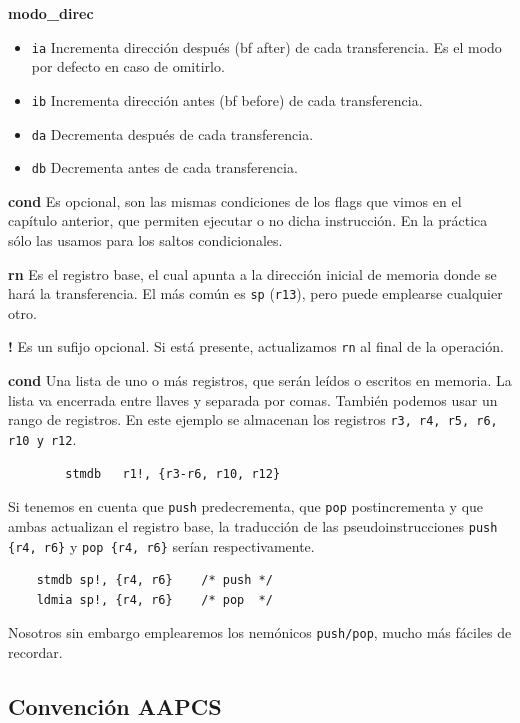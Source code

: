 {\bf modo\_direc}
\begin{itemize}
  \item{\tt ia} Incrementa dirección después ({bf a}fter) de cada transferencia. Es el modo por defecto
                en caso de omitirlo.
  \item{\tt ib} Incrementa dirección antes ({bf b}efore) de cada transferencia.
  \item{\tt da} Decrementa después de cada transferencia.
  \item{\tt db} Decrementa antes de cada transferencia.
\end{itemize}

{\bf cond} Es opcional, son las mismas condiciones de los flags que vimos en el capítulo
          anterior, que permiten ejecutar o no dicha instrucción. En la práctica sólo las
          usamos para los saltos condicionales.

{\bf rn} Es el registro base, el cual apunta a la dirección inicial de memoria donde
          se hará la transferencia. El más común es {\tt sp} ({\tt r13}), pero puede
          emplearse cualquier otro.

{\bf !} Es un sufijo opcional. Si está presente, actualizamos {\tt rn} al final de la operación.

{\bf cond} Una lista de uno o más registros, que serán leídos o escritos en memoria. La
          lista va encerrada entre llaves y separada por comas. También podemos
          usar un rango de registros. En este ejemplo se almacenan los registros {\tt r3, r4,
          r5, r6, r10 y r12}.

\begin{lstlisting}
        stmdb   r1!, {r3-r6, r10, r12}
\end{lstlisting}

Si tenemos en cuenta que {\tt push} predecrementa, que {\tt pop} postincrementa y que ambas
actualizan el registro base, la traducción de las pseudoinstrucciones {\tt push \{r4, r6\}}
y {\tt pop \{r4, r6\}} serían respectivamente.

\begin{lstlisting}
    stmdb sp!, {r4, r6}    /* push */
    ldmia sp!, {r4, r6}    /* pop  */
\end{lstlisting}

Nosotros sin embargo emplearemos los nemónicos {\tt push/pop}, mucho más fáciles de
recordar.

\subsection{Convención AAPCS}

